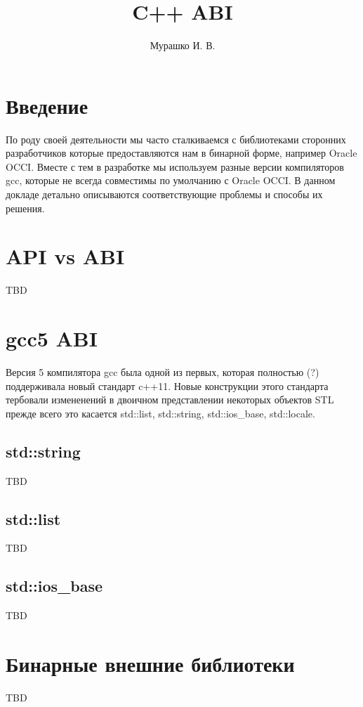 \documentclass[14pt,a4paper]{article}
\title{C++ ABI}
\author{Мурашко И. В.}
\date{}
\begin{document}
\Russian

\maketitle

\section*{Введение}
По роду своей деятельности мы часто сталкиваемся с библиотеками сторонних 
разработчиков которые предоставляются нам в бинарной форме, например 
Oracle OCCI. Вместе с тем в разработке мы используем разные версии 
компиляторов gcc, которые не всегда совместимы по умолчанию с Oracle OCCI. 
В данном докладе детально описываются соответствующие проблемы и способы 
их решения. 

\section{API vs ABI}

TBD

\section{gcc5 ABI}

Версия 5 компилятора gcc была одной из первых, которая полностью (?)
поддерживала новый стандарт c++11. Новые конструкции этого стандарта
тербовали измененений в двоичном представлении некоторых объектов STL
прежде всего это касается std::list, std::string, std::ios\_base,
std::locale. 

\subsection{std::string}

TBD

\subsection{std::list}

TBD

\subsection{std::ios\_base}

TBD

\section{Бинарные внешние библиотеки}

TBD
\end{document}
